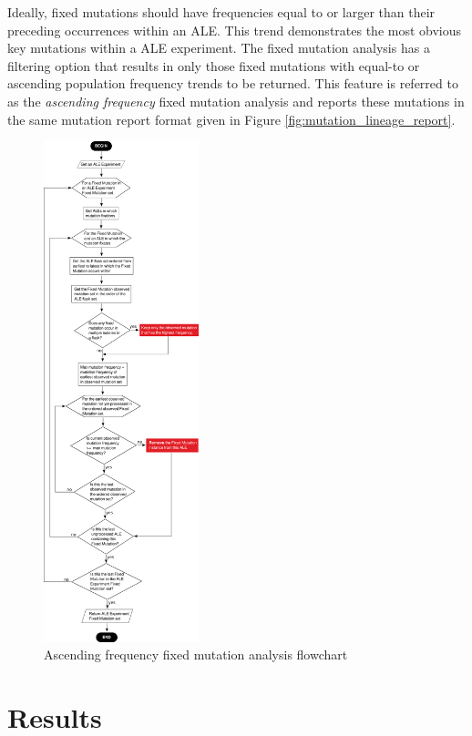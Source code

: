 \documentclass[12pt,final,masters,chapterheads]{ucsd}  %
\begin{document}
Ideally, fixed mutations should have frequencies equal to or larger than their preceding occurrences within an ALE. This trend demonstrates the most obvious key mutations within a ALE experiment. The fixed mutation analysis has a filtering option that results in only those fixed mutations with equal-to or ascending population frequency trends to be returned. This feature is referred to as the \textit{ascending frequency} fixed mutation analysis and reports these mutations in the same mutation report format given in Figure \ref{fig:mutation_lineage_report}.
\begin{figure}[H]
  \centering
  \includegraphics[width=0.4\textwidth]{ascending_freq_fixation_mutation_filter_flowchart.png}
  \caption{Ascending frequency fixed mutation analysis flowchart}
\end{figure}
\section{Results}
%
%
\end{document}
